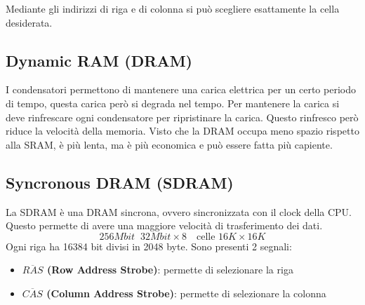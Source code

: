 \documentclass[a4paper]{article}
\theoremstyle{break}
\theoremstyle{break}
\theoremstyle{break}
\theoremstyle{break}
\begin{document}
\begin{figure}[H]
\end{figure}

\noindent Mediante gli indirizzi di riga e di colonna si può scegliere esattamente la
cella desiderata.

\subsection{Dynamic RAM (DRAM)}
I condensatori permettono di mantenere una carica elettrica per un certo
periodo di tempo, questa carica però si degrada nel tempo. Per mantenere la carica
si deve rinfrescare ogni condensatore per ripristinare la carica. Questo rinfresco
però riduce la velocità della memoria. Visto che la DRAM occupa meno spazio rispetto
alla SRAM, è più lenta, ma è più economica e può essere fatta più capiente.


\subsection{Syncronous DRAM (SDRAM)}
La SDRAM è una DRAM sincrona, ovvero sincronizzata con il clock della CPU. Questo
permette di avere una maggiore velocità di trasferimento dei dati.
\[
	256Mbit \;\; 32Mbit \times 8 \quad \text{celle } 16K \times 16K
\]
Ogni riga ha 16384 bit divisi in 2048 byte. Sono presenti 2 segnali:
\begin{itemize}
	\item \textbf{\( \overline{RAS} \) (Row Address Strobe)}: permette di selezionare la riga
	\item \textbf{\( \overline{CAS} \) (Column Address Strobe)}: permette di selezionare la colonna
\end{itemize}
\end{document}
